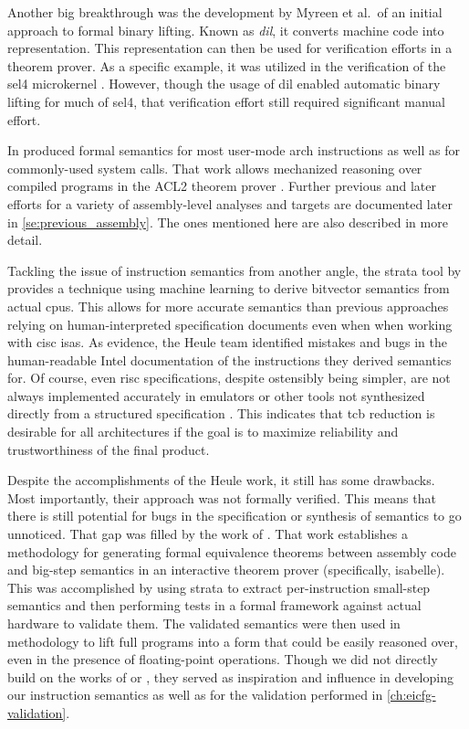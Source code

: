 Another big breakthrough was the development by Myreen et al.\ of an initial approach to formal binary lifting.
Known as \emph{\gls{dil}}, it converts machine code into  representation.
This representation can then be used for verification efforts in a theorem prover.
As a specific example, it was utilized in the verification of the \gls{sel4} microkernel \autocite{klein2009sel4,klein2014comprehensive,sel4}.
However, though the usage of \gls{dil} enabled automatic binary lifting for much of \gls{sel4}, that verification effort still required significant manual effort.

In \textcite{goel2014syscalls,goelphd} produced formal semantics for most user-mode \gls{arch} instructions as well as for commonly-used system calls.
That work allows mechanized reasoning over compiled programs in the ACL2 theorem prover \autocite{ACL2}.
Further previous and later efforts for a variety of assembly-level analyses and targets are documented later in \cref{se:previous_assembly}.
The ones mentioned here are also described in more detail.

Tackling the issue of instruction semantics from another angle, the \gls{strata} tool by \textcite{heule2016stratified} provides a technique using machine learning to derive bitvector semantics from actual \glspl{cpu}.
This allows for more accurate semantics than previous approaches relying on human-interpreted specification documents even when when working with \gls{cisc} \glspl{isa}.
As evidence, the Heule team identified mistakes and bugs in the human-readable Intel documentation of the instructions they derived semantics for.
Of course, even \gls{risc} specifications, despite ostensibly being simpler, are not always implemented accurately in emulators or other tools not synthesized directly from a structured specification \autocite{jiang2022examiner}.
This indicates that \gls{tcb} reduction is desirable for all architectures if the goal is to maximize reliability and trustworthiness of the final product.

Despite the accomplishments of the Heule work, it still has some drawbacks. Most importantly, their approach was not formally verified.
This means that there is still potential for bugs in the specification or synthesis of semantics to go unnoticed.
That gap was filled by the work of \textcite{roessle2019verified}.
That work establishes a methodology for generating formal equivalence theorems between assembly code and big-step semantics in an interactive theorem prover (specifically, \gls{isabelle}).
This was accomplished by using \gls{strata} to extract per-instruction small-step semantics and then performing tests in a formal framework against actual hardware to validate them.
The validated semantics were then used in  methodology to lift full programs into a form that could be easily reasoned over, even in the presence of floating-point operations.
Though we did not directly build on the works of \textcite{heule2016stratified} or \textcite{roessle2019verified}, they served as inspiration and influence in developing our instruction semantics as well as for the validation performed in \cref{ch:eicfg-validation}.

